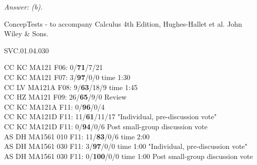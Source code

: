 {\it Answer: (b).} 

\medskip

ConcepTests - to accompany Calculus 4th Edition, Hughes-Hallet et al. John Wiley \& Sons.

SVC.01.04.030


CC KC MA121 F06: 0/{\bf 71}/7/21 \\
CC KC MA121 F07: 3/{\bf97}/0/0 time 1:30\\
CC LV MA121A F08: 9/{\bf63}/18/9 time 1:45\\
CC HZ MA121 F09: 26/{\bf65}/9/0 Review \\
CC KC MA121A F11: 0/{\bf96}/0/4  \\
CC KC MA121D F11: 11/{\bf61}/11/17 "Individual, pre-discussion vote" \\
CC KC MA121D F11: 0/{\bf94}/0/6 Post small-group discussion vote \\
AS DH MA1561 010 F11: 11/{\bf83}/0/6 time 2:00  \\
AS DH MA1561 030 F11: 3/{\bf97}/0/0 time 1:00 "Individual, pre-discussion vote" \\
AS DH MA1561 030 F11: 0/{\bf100}/0/0 time 1:00 Post small-group discussion vote \\
